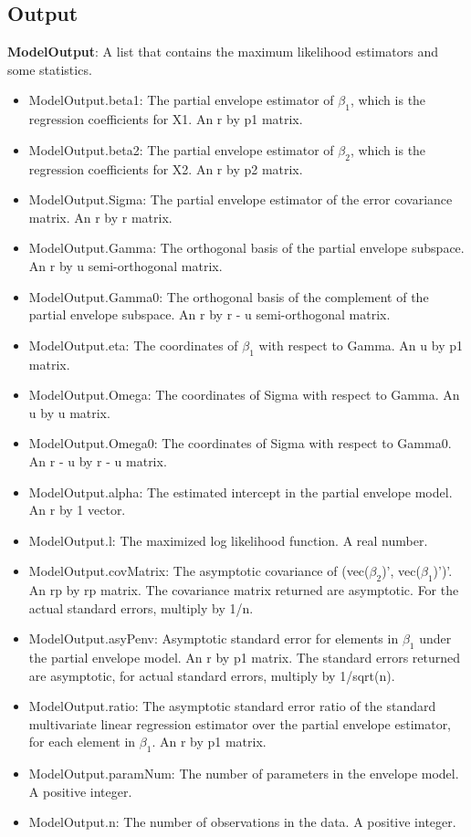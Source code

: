 \documentclass[a4paper,11pt,openany]{memoir}
\begin{document}
\subsection*{Output}

\begin{par}
\textbf{ModelOutput}: A list that contains the maximum likelihood estimators and some statistics.
\end{par} \vspace{1em}
\begin{itemize}
\setlength{\itemsep}{-1ex}
   \item ModelOutput.beta1: The partial envelope estimator of $\beta_1$, which is the regression coefficients for X1. An r by p1 matrix.
   \item ModelOutput.beta2: The partial envelope estimator of $\beta_2$, which is the regression coefficients for X2. An r by p2 matrix.
   \item ModelOutput.Sigma: The partial envelope estimator of the error covariance matrix.  An r by r matrix.
   \item ModelOutput.Gamma: The orthogonal basis of the partial envelope subspace. An r by u semi-orthogonal matrix.
   \item ModelOutput.Gamma0: The orthogonal basis of the complement of the partial envelope subspace.  An r by r - u semi-orthogonal matrix.
   \item ModelOutput.eta: The coordinates of $\beta_1$ with respect to Gamma. An u by p1 matrix.
   \item ModelOutput.Omega: The coordinates of Sigma with respect to Gamma. An u by u matrix.
   \item ModelOutput.Omega0: The coordinates of Sigma with respect to Gamma0. An r - u by r - u matrix.
   \item ModelOutput.alpha: The estimated intercept in the partial envelope model.  An r by 1 vector.
   \item ModelOutput.l: The maximized log likelihood function.  A real number.
   \item ModelOutput.covMatrix: The asymptotic covariance of (vec($\beta_2$)', vec($\beta_1$)')'.  An rp by rp matrix.  The covariance matrix returned are asymptotic.  For the actual standard errors, multiply by 1/n.
   \item ModelOutput.asyPenv: Asymptotic standard error for elements in $\beta_1$ under the partial envelope model.  An r by p1 matrix.  The standard errors returned are asymptotic, for actual standard errors, multiply by 1/sqrt(n).
   \item ModelOutput.ratio: The asymptotic standard error ratio of the standard multivariate linear regression estimator over the partial envelope estimator, for each element in $\beta_1$.  An r by p1 matrix.
   \item ModelOutput.paramNum: The number of parameters in the envelope model.  A positive integer.
   \item ModelOutput.n: The number of observations in the data.  A positive integer.
\end{itemize}
\end{document}
